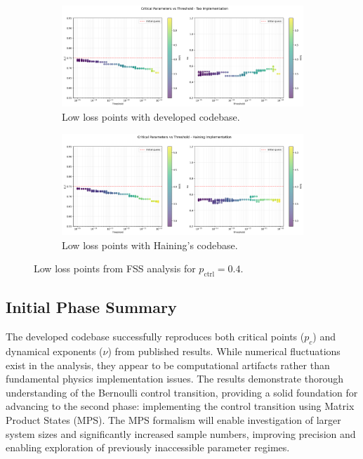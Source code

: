 \documentclass[11pt,a4paper]{article}
\begin{document}
\begin{figure}[H]
    \centering
    \begin{subfigure}[t]{0.8\linewidth}
        \centering
        \includegraphics[width=\linewidth]{threshold_dependence_pctrl0.400_tao.png}
        \caption{Low loss points with developed codebase.}
    \end{subfigure}
    \vfill
    \begin{subfigure}[b]{0.8\linewidth}
        \centering
        \includegraphics[width=\linewidth]{threshold_dependence_pctrl0.400_haining.png}
        \caption{Low loss points with Haining's codebase.}
    \end{subfigure}
    \caption{Low loss points from FSS analysis for $p_\text{ctrl}=0.4$.}
    \label{fig:low_loss_points_combined_pctrl0.400}
\end{figure}

\subsection{Initial Phase Summary}

The developed codebase successfully reproduces both critical points ($p_c$) and dynamical exponents ($\nu$) from published results. While numerical fluctuations exist in the analysis, they appear to be computational artifacts rather than fundamental physics implementation issues. The results demonstrate thorough understanding of the Bernoulli control transition, providing a solid foundation for advancing to the second phase: implementing the control transition using Matrix Product States (MPS). The MPS formalism will enable investigation of larger system sizes and significantly increased sample numbers, improving precision and enabling exploration of previously inaccessible parameter regimes.
\end{document}
